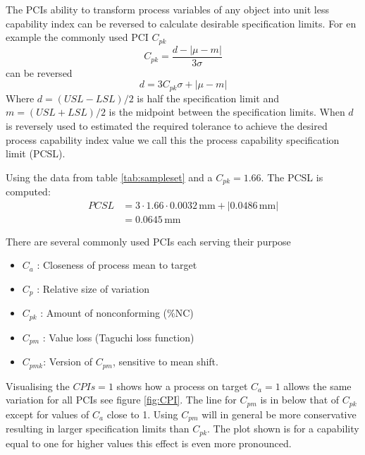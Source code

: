 \documentclass[aip,amsmath, preprint, author-year]{revtex4-1}
\begin{document}
The PCIs ability to transform process variables of any object into unit less capability index can be reversed to calculate desirable specification limits. For en example the commonly used PCI $C_{pk}$ 
\begin{equation}
	C_{pk} = \frac{d - | \mu - m|}{3 \sigma} \nonumber
\end{equation}
can be reversed
\begin{equation}
	d = 3 C_{pk} \sigma + | \mu - m|
\end{equation}
Where $d = (USL - LSL) / 2$ is half the specification limit and $m = (USL + LSL) / 2$ is the midpoint between the specification limits. When $d$ is reversely used to estimated the required tolerance to achieve the desired process capability index value we call this the process capability specification limit (PCSL). 

Using the data from table \ref{tab:sampleset} and a $C_{pk} = 1.66$. The PCSL is computed: 
\begin{align*}
PCSL &= 3 \cdot 1.66 \cdot 0.0032 \, \mathrm{mm}
+ |0.0486  \, \mathrm{mm}| \\
&= 0.0645  \, \mathrm{mm}
\end{align*}


There are several commonly used PCIs each serving their purpose \citep{wu2009overview, taguchi1986introduction}
\begin{itemize}
	\item $C_a$ : Closeness of process mean to target 
	\item $C_p$ : Relative size of variation
	\item $C_{pk}$ : Amount of nonconforming (\%NC)
	\item $C_{pm}$ : Value loss (Taguchi loss function)
	\item $C_{pmk}$: Version of $C_{pm}$,  sensitive to mean shift. 
\end{itemize}

Visualising the $CPIs = 1$  shows how a process on target $C_a = 1$ allows the same variation for all PCIs see figure \ref{fig:CPI}. 
The line for $C_{pm}$ is in below that of $C_{pk}$ except for values of $C_a$ close to 1. 
Using $C_{pm}$ will in general be more conservative resulting in larger specification limits than $C_{pk}$. The plot shown is for a capability equal to one for higher values this effect is even more pronounced.
\end{document}
